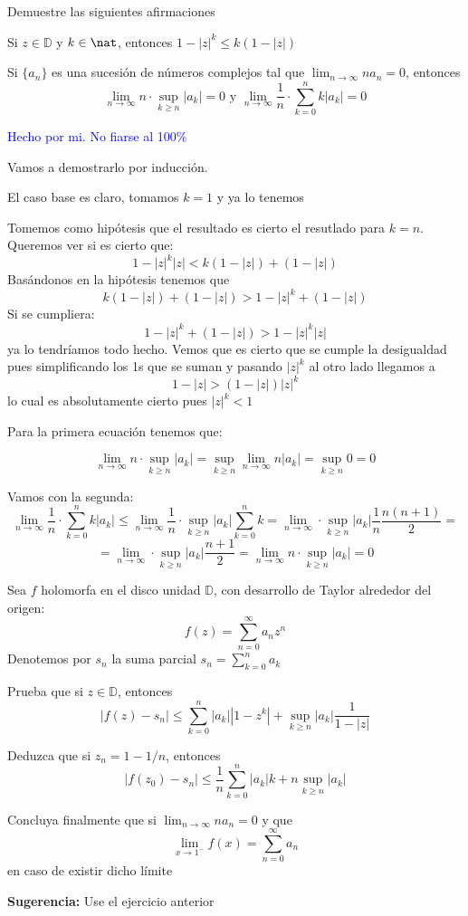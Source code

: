 \begin{problem}[21]
Demuestre las siguientes afirmaciones

\ppart Si $z \in \mathbb{D}$ y $k \in \nat$, entonces $1-|z|^k \leq k(1-|z|)$

\ppart Si $\{a_n\}$ es una sucesión de números complejos tal que $\lim_{n \to \infty} na_n=0$, entonces
\[\lim_{n\to \infty}n \cdot \sup_{k \geq n}|a_k| = 0 \text{  y  } \lim_{n \to \infty}\frac{1}{n}\cdot \sum_{k=0}^nk|a_k|=0\]

\solution
\textcolor{blue}{Hecho por mi. No fiarse al 100\%}

\spart
Vamos a demostrarlo por inducción.

El caso base es claro, tomamos $k=1$ y ya lo tenemos

Tomemos como hipótesis que el resultado es cierto el resutlado para $k=n$. Queremos ver si es cierto que:
\[1-|z|^k|z| < k(1-|z|)+(1-|z|)\]
Basándonos en la hipótesis tenemos que
\[ k(1-|z|)+(1-|z|) > 1-|z|^k+(1-|z|)\]
Si se cumpliera:
\[1-|z|^k+(1-|z|) > 1-|z|^k|z|\]
ya lo tendríamos todo hecho. Vemos que es cierto que se cumple la desigualdad pues simplificando los 1s que se suman y pasando $|z|^k$ al otro lado llegamos a
\[1-|z| > (1-|z|)|z|^k\]
lo cual es absolutamente cierto pues $|z|^k < 1$

\spart

Para la primera ecuación tenemos que:

\[\lim_{n\to \infty}n \cdot \sup_{k \geq n}|a_k| = \sup_{k \geq n} \lim_{n\to \infty}n |a_k| = \sup_{k \geq n} 0 = 0\]

Vamos con la segunda:
\[\lim_{n \to \infty}\frac{1}{n}\cdot \sum_{k=0}^nk|a_k| \leq \lim_{n \to \infty}\frac{1}{n}\cdot \sup_{k \geq n}|a_k| \sum_{k=0}^nk = \lim_{n \to \infty}\cdot \sup_{k \geq n}|a_k| \frac{1}{n} \frac{n(n+1)}{2}=\]
\[=\lim_{n \to \infty}\cdot \sup_{k \geq n}|a_k|\frac{n+1}{2} = \lim_{n\to \infty}n \cdot \sup_{k \geq n}|a_k| = 0\]
\end{problem}

\begin{problem}[22]
Sea $f$ holomorfa en el disco unidad $\mathbb{D}$, con desarrollo de Taylor alrededor del origen:
\[f(z)=\sum_{n=0}^{\infty}a_nz^n\]
Denotemos por $s_n$ la suma parcial $s_n=\sum_{k=0}^n a_k$

\ppart Prueba que si $z \in \mathbb{D}$, entonces
\[|f(z)-s_n| \leq \sum_{k=0}^n|a_k||1-z^k|+\sup_{k \geq n}|a_k|\frac{1}{1-|z|}\]

\ppart Deduzca que si $z_n=1-1/n$, entonces
\[|f(z_0)-s_n|\leq \frac{1}{n}\sum_{k=0}^n |a_k|k+n\sup_{k \geq n}|a_k|\]

\ppart Concluya finalmente que si $\lim_{n\to\infty}na_n=0$ y que
\[\lim_{x \to 1^-}f(x) = \sum_{n=0}^{\infty}a_n\]
en caso de existir dicho límite


\textbf{Sugerencia:} Use el ejercicio anterior
\solution

\end{problem}
\newpage
